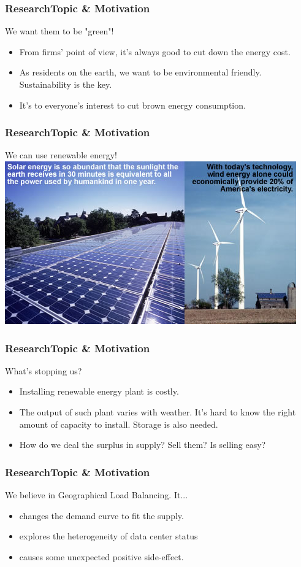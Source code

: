 \documentclass{beamer}
\begin{document}
%
%
\begin{frame}
\frametitle{ResearchTopic \& Motivation}
\begin{block}
{We want them to be "green"!}
\begin{itemize}
\item
From firms' point of view, it's always good to cut down the energy cost.
\item
As residents on the earth, we want to be environmental friendly. Sustainability is the key.
\item
It's to everyone's interest to cut brown energy consumption.  
\end{itemize}
\end{block}
\end{frame}
%
%
\begin{frame}
\frametitle{ResearchTopic \& Motivation}
\begin{block}
{We can use renewable energy!}
\includegraphics[scale = 0.6]{renewables.jpg}
\end{block}
\end{frame}
%
%
\begin{frame}
\frametitle{ResearchTopic \& Motivation}
\begin{block}
{What's stopping us?}
\begin{itemize}
\item
Installing renewable energy plant is costly.
\item
The output of such plant varies with weather. It's hard to know the right amount of capacity to install. Storage is also needed.
\item
How do we deal the surplus in supply? Sell them? Is selling easy?
\end{itemize}
\end{block}
\end{frame}
%
%
\begin{frame}
\frametitle{ResearchTopic \& Motivation}
\begin{block}
{We believe in Geographical Load Balancing.}
It...
\begin{itemize}
\item
changes the demand curve to fit the supply.
\item
explores the heterogeneity of data center status
\item
causes some unexpected positive side-effect.
\end{itemize}
\end{block}
\end{frame}
\end{document}
